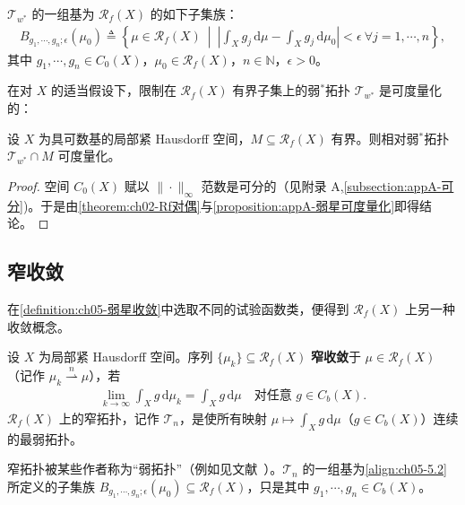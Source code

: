 \documentclass[../../main.tex]{subfiles}%
\begin{document}
$\mathcal{T}_{w^*}$ 的一组基为 $\mathscr{R}_f(X)$ 的如下子集族：
\begin{align}
B_{g_1,\cdots ,g_n;\epsilon}(\mu_0)
\triangleq \left\{\mu\in\mathscr{R}_f(X)\ \middle|\
\left|\int_X g_j\,\mathrm{d}\mu-\int_X g_j\,\mathrm{d}\mu_0\right|<\epsilon
\ \forall j=1,\cdots ,n\right\},\label{align:ch05-5.2}
\end{align}
其中 $g_1,\cdots ,g_n\in C_0(X)$，$\mu_0\in\mathscr{R}_f(X)$，$n\in\mathbb{N}$，$\epsilon>0$。

在对 $X$ 的适当假设下，限制在 $\mathscr{R}_f(X)$ 有界子集上的弱$^*$拓扑 $\mathcal{T}_{w^*}$ 是可度量化的：

\begin{proposition}\label{proposition:ch05-弱星可度量化}
\label{theorem:ch05-弱星可测}
设 $X$ 为具可数基的局部紧 Hausdorff 空间，$M\subseteq\mathscr{R}_f(X)$ 有界。则相对弱$^*$拓扑 $\mathcal{T}_{w^*}\cap M$ 可度量化。
\end{proposition}

\begin{proof}
空间 $C_0(X)$ 赋以 $\|\cdot\|_\infty$ 范数是可分的（见附录 A,\cref{subsection:appA-可分})。于是由\cref{theorem:ch02-Rf对偶}与\cref{proposition:appA-弱星可度量化}即得结论。
\end{proof}

\subsection{窄收敛}

在\cref{definition:ch05-弱星收敛}中选取不同的试验函数类，便得到 $\mathscr{R}_f(X)$ 上另一种收敛概念。

\begin{definition}\label{definition:ch05-窄收敛}
设 $X$ 为局部紧 Hausdorff 空间。序列 $\{\mu_k\}\subseteq\mathscr{R}_f(X)$ \textbf{窄收敛}于 $\mu\in\mathscr{R}_f(X)$（记作 $\mu_k\stackrel{n}{\rightharpoonup}\mu$），若
\begin{align}
\lim_{k\to\infty}\int_X g\,\mathrm{d}\mu_k=\int_X g\,\mathrm{d}\mu
\quad\text{对任意 }g\in C_b(X).\label{align:ch05-5.3}
\end{align}
$\mathscr{R}_f(X)$ 上的窄拓扑，记作 $\mathcal{T}_n$，是使所有映射 $\mu\mapsto\int_X g\,\mathrm{d}\mu$（$g\in C_b(X)$）连续的最弱拓扑。
\end{definition}

窄拓扑被某些作者称为“弱拓扑”（例如见文献~\cite{ref45}）。$\mathcal{T}_n$ 的一组基为\eqref{align:ch05-5.2}所定义的子集族 $B_{g_1,\cdots ,g_n;\epsilon}(\mu_0)\subseteq\mathscr{R}_f(X)$，只是其中 $g_1,\cdots ,g_n\in C_b(X)$。
\end{document}
